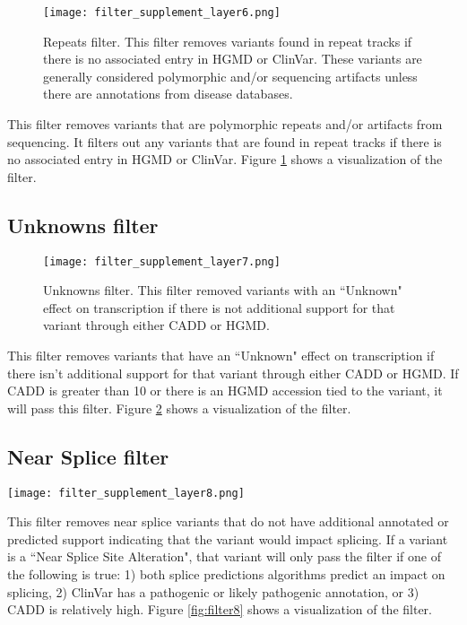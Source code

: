 \documentclass{article}
\begin{document}
\begin{figure}
\centering
\texttt{[image: filter\_supplement\_layer6.png]}
\caption{Repeats filter.  This filter removes variants found in repeat tracks if there is no associated entry in HGMD or ClinVar.  These variants are generally considered polymorphic and/or sequencing artifacts unless there are annotations from disease databases.}
\label{fig:filter6}
\end{figure}

This filter removes variants that are polymorphic repeats and/or artifacts from sequencing.  It filters out any variants that are found in repeat tracks if there is no associated entry in HGMD or ClinVar.  Figure \ref{fig:filter6} shows a visualization of the filter.

\subsection{Unknowns filter}

\begin{figure}
\centering
\texttt{[image: filter\_supplement\_layer7.png]}
\caption{Unknowns filter.  This filter removed variants with an ``Unknown" effect on transcription if there is not additional support for that variant through either CADD or HGMD.}
\label{fig:filter7}
\end{figure}

This filter removes variants that have an ``Unknown" effect on transcription if there isn't additional support for that variant through either CADD or HGMD.  If CADD is greater than 10 or there is an HGMD accession tied to the variant, it will pass this filter.  Figure \ref{fig:filter7} shows a visualization of the filter.

\subsection{Near Splice filter}

\begin{sidewaysfigure}
\centering
\texttt{[image: filter\_supplement\_layer8.png]}
\caption{Near Splice filter.  This filter removes ``Near Splice Site Alteration" variants that are not supported to be deleterious by splice prediction algorithms, ClinVar annotations, or CADD predictions.}
\label{fig:filter8}
\end{sidewaysfigure}

This filter removes near splice variants that do not have additional annotated or predicted support indicating that the variant would impact splicing.  If a variant is a ``Near Splice Site Alteration", that variant will only pass the filter if one of the following is true: 1) both splice predictions algorithms predict an impact on splicing, 2) ClinVar has a pathogenic or likely pathogenic annotation, or 3) CADD is relatively high.  Figure \ref{fig:filter8} shows a visualization of the filter. 
\end{document}
